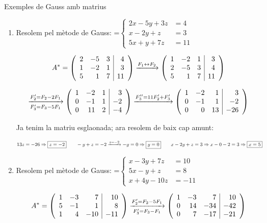 \documentclass[11pt,a4paper]{article}
\newcommand{\fmm}[1]{\setbox0=\hbox{$#1$}\ifdim\wd0>\linewidth\fmdisp{#1}\else\mbox{\box0}\fi}
\newcommand{\fmdisp}[1]{\[\setbox2=\hbox{$\displaystyle #1$}\ifdim\wd2>\linewidth\resizebox{\linewidth}{!}{\box2}\else\box2\fi\]}
\begin{document}
\begin{fmex}{Exemples de Gauss amb matrius}
\begin{enumerate}[label=\textbf{\arabic*.},leftmargin=*]
\item Resolem pel mètode de Gauss: \fmm{\left\{\begin{aligned}2x-5y+3z&=4\\ x-2y+z&=3\\ 5x+y+7z&=11\end{aligned}\right.}

\fmdisp{A^*=\left(\begin{array}{rrr|r}2 & -5 & 3 & 4\\ 1 & -2 & 1 & 3\\ 5 & 1 & 7 & 11\end{array}\right)\xrightarrow{F_1\leftrightarrow F_2}\left(\begin{array}{rrr|r}1 & -2 & 1 & 3\\ 2 & -5 & 3 & 4\\ 5 & 1 & 7 & 11\end{array}\right)}

\fmdisp{\xrightarrow[F_3'=F_3-5F_1]{F_2'=F_2-2F_1}\left(\begin{array}{rrr|r}1 & -2 & 1 & 3\\ 0 & -1 & 1 & -2\\ 0 & 11 & 2 & -4\end{array}\right)\xrightarrow{F_3''=11F_2'+F_3'}\left(\begin{array}{rrr|r}1 & -2 & 1 & 3\\ 0 & -1 & 1 & -2\\ 0 & 0 & 13 & -26\end{array}\right)}

Ja tenim la matriu esglaonada; ara resolem de baix cap amunt:

\fmdisp{13z=-26\Rightarrow\boxed{z=-2}\qquad -y+z=-2\xrightarrow{z=-2}-y=0\Rightarrow\boxed{y=0}\qquad x-2y+z=3\Rightarrow x-0-2=3\Rightarrow\boxed{x=5}}

\item Resolem pel mètode de Gauss: \fmm{\left\{\begin{aligned}x-3y+7z&=10\\ 5x-y+z&=8\\ x+4y-10z&=-11\end{aligned}\right.}

\fmdisp{A^*=\left(\begin{array}{rrr|r}1 & -3 & 7 & 10\\ 5 & -1 & 1 & 8\\ 1 & 4 & -10 & -11\end{array}\right)\xrightarrow[F_3'=F_3-F_1]{F_2'=F_2-5F_1}\left(\begin{array}{rrr|r}1 & -3 & 7 & 10\\ 0 & 14 & -34 & -42\\ 0 & 7 & -17 & -21\end{array}\right)}


\end{enumerate}
\end{fmex}
\end{document}
